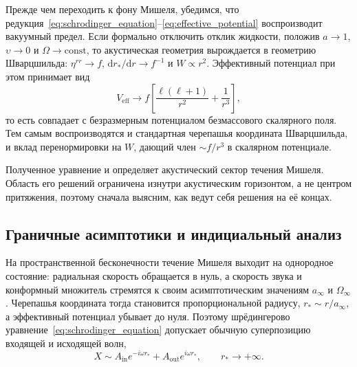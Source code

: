 \documentclass[12pt,a4paper,preprint,nopreprintline]{elsarticle}
\begin{document}
Прежде чем переходить к фону Мишеля, убедимся, что редукция~\eqref{eq:schrodinger_equation}--\eqref{eq:effective_potential} воспроизводит вакуумный предел. Если формально отключить отклик жидкости, положив $a\rightarrow1$, $\upsilon\rightarrow0$ и $\Omega\rightarrow\mathrm{const}$, то акустическая геометрия вырождается в геометрию Шварцшильда: $\eta^{rr}\rightarrow f$, $\mathrm{d}r_{*}/\mathrm{d}r\rightarrow f^{-1}$ и $W\propto r^{2}$. Эффективный потенциал при этом принимает вид
\begin{equation}
    V_{\mathrm{eff}}
    \longrightarrow
    f\left[
        \frac{\ell(\ell+1)}{r^{2}}+\frac{1}{r^{3}}
    \right],
    \label{eq:scalar_schwarzschild_potential}
\end{equation}
то есть совпадает с безразмерным потенциалом безмассового скалярного поля. Тем самым воспроизводятся и стандартная черепашья координата Шварцшильда, и вклад перенормировки на $W$, дающий член $\sim f/r^{3}$ в скалярном потенциале.

Полученное уравнение и определяет акустический сектор течения Мишеля. Область его решений ограничена изнутри акустическим горизонтом, а не центром притяжения, поэтому сначала выясним, как ведут себя решения на её концах.

\subsection{Граничные асимптотики и индициальный анализ}
\label{sec:boundary_asymptotics}

На пространственной бесконечности течение Мишеля выходит на однородное состояние: радиальная скорость обращается в нуль, а скорость звука и конформный множитель стремятся к своим асимптотическим значениям $a_{\infty}$ и $\Omega_{\infty}$. Черепашья координата тогда становится пропорциональной радиусу, $r_{*}\sim r/a_{\infty}$, а эффективный потенциал убывает до нуля. Поэтому шрёдингерово уравнение~\eqref{eq:schrodinger_equation} допускает обычную суперпозицию входящей и исходящей волн,
\begin{equation}
    X\sim
    A_{\mathrm{in}}e^{-i\omega r_{*}}
    +
    A_{\mathrm{out}}e^{i\omega r_{*}},
    \qquad r_{*}\rightarrow+\infty.
    \label{eq:infinity_asymptotics}
\end{equation}
\end{document}
